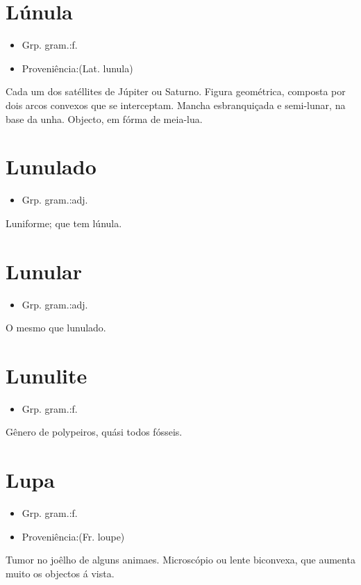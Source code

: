 \section{Lúnula}
\begin{itemize}
\item {Grp. gram.:f.}
\end{itemize}
\begin{itemize}
\item {Proveniência:(Lat. \textunderscore lunula\textunderscore )}
\end{itemize}
Cada um dos satéllites de Júpiter ou Saturno.
Figura geométrica, composta por dois arcos convexos que se interceptam.
Mancha esbranquiçada e semi-lunar, na base da unha.
Objecto, em fórma de meia-lua.
\section{Lunulado}
\begin{itemize}
\item {Grp. gram.:adj.}
\end{itemize}
Luniforme; que tem lúnula.
\section{Lunular}
\begin{itemize}
\item {Grp. gram.:adj.}
\end{itemize}
O mesmo que \textunderscore lunulado\textunderscore .
\section{Lunulite}
\begin{itemize}
\item {Grp. gram.:f.}
\end{itemize}
Gênero de polypeiros, quási todos fósseis.
\section{Lupa}
\begin{itemize}
\item {Grp. gram.:f.}
\end{itemize}
\begin{itemize}
\item {Proveniência:(Fr. \textunderscore loupe\textunderscore )}
\end{itemize}
Tumor no joêlho de alguns animaes.
Microscópio ou lente biconvexa, que aumenta muito os objectos á vista.
